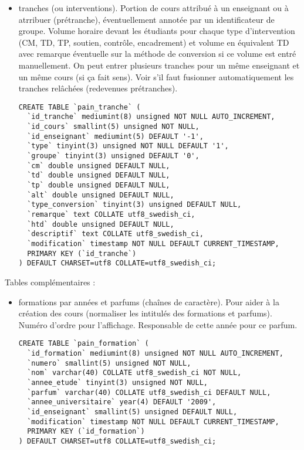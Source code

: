 \documentclass{article}
\begin{document}
\begin{itemize}
\item tranches (ou interventions). Portion de cours attribué à un enseignant ou à atrribuer (prétranche), éventuellement annotée par un identificateur de groupe. Volume horaire devant les étudiants pour chaque type d'intervention (CM, TD, TP, soutien, contrôle, encadrement)  et volume en équivalent TD avec remarque éventuelle sur la méthode de conversion si ce volume est entré manuellement. On peut entrer plusieurs tranches pour un même enseignant et un même cours (si ça fait sens). Voir s'il faut fusionner automatiquement les tranches relâchées (redevenues prétranches). 
\begin{verbatim}
CREATE TABLE `pain_tranche` (
  `id_tranche` mediumint(8) unsigned NOT NULL AUTO_INCREMENT,
  `id_cours` smallint(5) unsigned NOT NULL,
  `id_enseignant` mediumint(5) DEFAULT '-1',
  `type` tinyint(3) unsigned NOT NULL DEFAULT '1',
  `groupe` tinyint(3) unsigned DEFAULT '0',
  `cm` double unsigned DEFAULT NULL,
  `td` double unsigned DEFAULT NULL,
  `tp` double unsigned DEFAULT NULL,
  `alt` double unsigned DEFAULT NULL,
  `type_conversion` tinyint(3) unsigned DEFAULT NULL,
  `remarque` text COLLATE utf8_swedish_ci,
  `htd` double unsigned DEFAULT NULL,
  `descriptif` text COLLATE utf8_swedish_ci,
  `modification` timestamp NOT NULL DEFAULT CURRENT_TIMESTAMP,
  PRIMARY KEY (`id_tranche`)
) DEFAULT CHARSET=utf8 COLLATE=utf8_swedish_ci;
\end{verbatim}
\end{itemize}

Tables complémentaires :
\begin{itemize}
\item formations par années et parfums (chaînes de caractère). Pour aider à la création des cours (normaliser les intitulés des formations et parfums). Numéro d'ordre pour l'affichage. Responsable de cette année pour ce parfum.

\begin{verbatim}
CREATE TABLE `pain_formation` (
  `id_formation` mediumint(8) unsigned NOT NULL AUTO_INCREMENT,
  `numero` smallint(5) unsigned NOT NULL,
  `nom` varchar(40) COLLATE utf8_swedish_ci NOT NULL,
  `annee_etude` tinyint(3) unsigned NOT NULL,
  `parfum` varchar(40) COLLATE utf8_swedish_ci DEFAULT NULL,
  `annee_universitaire` year(4) DEFAULT '2009',
  `id_enseignant` smallint(5) unsigned DEFAULT NULL,
  `modification` timestamp NOT NULL DEFAULT CURRENT_TIMESTAMP,
  PRIMARY KEY (`id_formation`)
) DEFAULT CHARSET=utf8 COLLATE=utf8_swedish_ci;

\end{verbatim}
\end{itemize}
\end{document}
